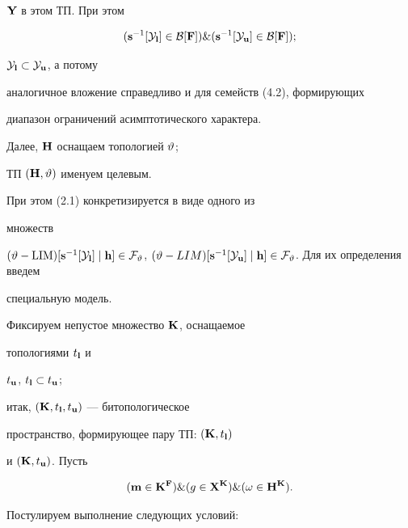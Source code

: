 ${\bold Y}$ в этом ТП. При этом


\begin{equation}


({{\bold s}^{-1}}[{\cal Y}_{\bold l}] \in {{\cal B}[{\bold F}]}) \&


({{\bold s}^{-1}}[{\cal Y}_{\bold u}] \in {{\cal B}[{\bold F}]});


\end{equation}


${{\cal Y}_{\bold l}} \subset {{\cal Y}_{\bold u}}$, а потому


аналогичное вложение справедливо и для семейств (4.2), формирующих


диапазон ограничений асимптотического характера.


Далее, ${\bold H}$ оснащаем топологией ${\vartheta}$;


ТП $({\bold H},\vartheta)$ именуем целевым.


При этом (2.1) конкретизируется в виде одного из


множеств


$(\vt - {\LIM})[{{\bold s}^{-1}}[{\cal Y}_{\bold l}] \mid {\bold h}] \in


{{\cal F}_\vt}$, $(\vt - {LIM})[{{\bold s}^{-1}}[{\cal Y}_{\bold u}] \mid


{\bold h}] \in {{\cal F}_\vt}$. Для их определения введем


специальную модель.





Фиксируем непустое множество ${\bold K}$, оснащаемое


топологиями ${t_{\bold l}}$ и


${t_{\bold u}}$, ${t_{\bold l}} \subset {t_{\bold u}}$;


итак, $({\bold K},{t_{\bold l}},{t_{\bold u}})$ --- битопологическое


пространство, формирующее пару ТП: $({\bold K},{t_{\bold l}})$


и $({\bold K},{t_{\bold u}})$. Пусть


\begin{equation}


({\bold m} \in {{\bold K}^{\bold F}}) \& (g \in {{\bold X}^{\bold K}}) \&


(\omega \in {{\bold H}^{\bold K}}).


\end{equation}


Постулируем выполнение следующих условий:


